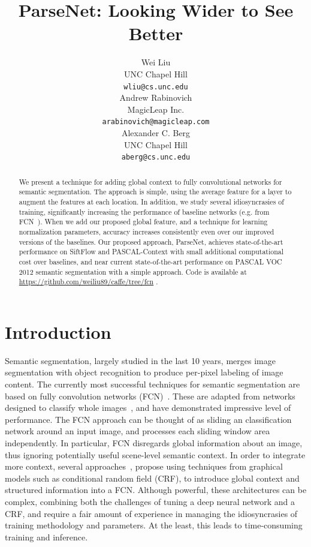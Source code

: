 \documentclass{article} %
\title{ParseNet: Looking Wider to See Better}
\author{Wei Liu\\
UNC Chapel Hill\\
\texttt{wliu@cs.unc.edu} \\
\And
Andrew Rabinovich\\
MagicLeap Inc.\\
\texttt{arabinovich@magicleap.com} \\
\And
Alexander C. Berg\\
UNC Chapel Hill\\
\texttt{aberg@cs.unc.edu}
}
\begin{document}
\maketitle

\begin{abstract}
We present a technique for adding global context to fully convolutional networks for semantic segmentation. The approach is simple, using the average feature for a layer to augment the features at each location. In addition, we study several idiosyncrasies of training, significantly increasing the performance of baseline networks (e.g. from FCN~\cite{long2014fully}). When we add our proposed global feature, and a technique for learning normalization parameters, accuracy increases consistently even over our improved versions of the baselines. Our proposed approach, ParseNet, achieves state-of-the-art performance on SiftFlow and PASCAL-Context with small additional computational cost over baselines, and near current state-of-the-art performance on PASCAL VOC 2012 semantic segmentation with a simple approach. Code is available at \url{https://github.com/weiliu89/caffe/tree/fcn} .
\end{abstract}

\section{Introduction}
Semantic segmentation, largely studied in the last 10 years, merges image segmentation with object recognition to produce per-pixel labeling of image content. The currently most successful techniques for semantic segmentation are based on fully convolution networks (FCN)~\cite{long2014fully}. These are adapted from networks designed to classify whole images~\cite{krizhevsky2012imagenet,szegedy2014going,simonyan2014very}, and have demonstrated impressive level of performance. The FCN approach can be thought of as sliding an classification network around an input image, and processes each sliding window area independently. In particular, FCN disregards global information about an image, thus ignoring potentially useful scene-level semantic context. In order to integrate more context, several approaches~\cite{chen2014semantic, schwing2015fully, lin2015efficient, zheng2015conditional}, propose using techniques from graphical models such as conditional random field (CRF), to introduce global context and structured information into a FCN. Although powerful, these architectures can be complex, combining both the challenges of tuning a deep neural network and a CRF, and require a fair amount of experience in managing the idiosyncrasies of training methodology and parameters. At the least, this leads to time-consuming training and inference.
\end{document}
